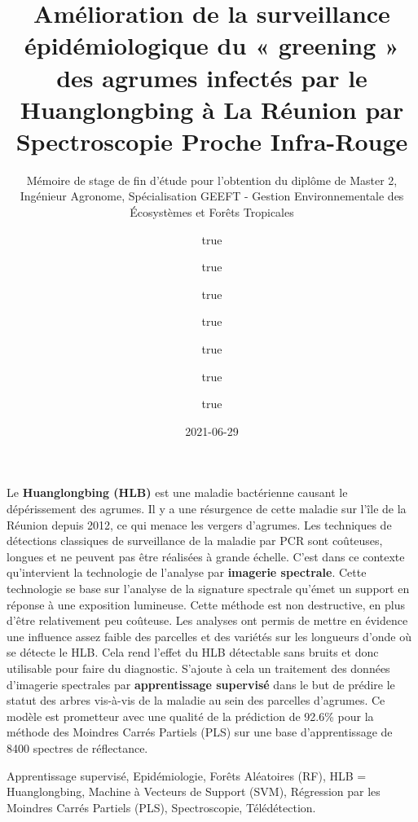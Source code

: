 \documentclass[
  11pt,
  french,
  a4paper,
  extrafontsizes,onecolumn,openright
  ]{memoir}
\title{Amélioration de la surveillance épidémiologique du « greening » des agrumes infectés par le Huanglongbing à La Réunion par Spectroscopie Proche Infra-Rouge}
\subtitle{Mémoire de stage de fin d'étude pour l'obtention du diplôme de Master 2, Ingénieur Agronome, Spécialisation GEEFT - Gestion Environnementale des Écosystèmes et Forêts Tropicales}
\author{true \and true \and true \and true \and true \and true \and true}
\date{2021-06-29}
\begin{document}
\frontmatter



\cleardoublepage



\begin{description}

\item[Résumé:]
Le \textbf{Huanglongbing (HLB)} est une maladie bactérienne causant le dépérissement des agrumes. Il y a une résurgence de cette maladie sur l'île de la Réunion depuis 2012, ce qui menace les vergers d'agrumes. Les techniques de détections classiques de surveillance de la maladie par PCR sont coûteuses, longues et ne peuvent pas être réalisées à grande échelle. C'est dans ce contexte qu'intervient la technologie de l'analyse par \textbf{imagerie spectrale}. Cette technologie se base sur l'analyse de la signature spectrale qu'émet un support en réponse à une exposition lumineuse. Cette méthode est non destructive, en plus d'être relativement peu coûteuse. Les analyses ont permis de mettre en évidence une influence assez faible des parcelles et des variétés sur les longueurs d'onde où se détecte le HLB. Cela rend l'effet du HLB détectable sans bruits et donc utilisable pour faire du diagnostic. S'ajoute à cela un traitement des données d'imagerie spectrales par \textbf{apprentissage supervisé} dans le but de prédire le statut des arbres vis-à-vis de la maladie au sein des parcelles d'agrumes. Ce modèle est prometteur avec une qualité de la prédiction de 92.6\% pour la méthode des Moindres Carrés Partiels (PLS) sur une base d'apprentissage de 8400 spectres de réflectance.

\item[Mots clés :]
Apprentissage supervisé, Epidémiologie, Forêts Aléatoires (RF), HLB = Huanglongbing, Machine à Vecteurs de Support (SVM), Régression par les Moindres Carrés Partiels (PLS), Spectroscopie, Télédétection.


\end{description}
\end{document}
